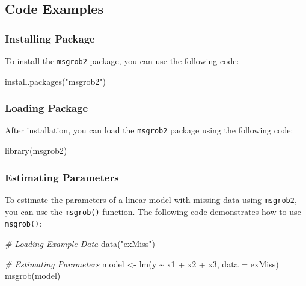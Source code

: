 \documentclass[
]{book}
\newenvironment{Shaded}{\begin{snugshade}}{\end{snugshade}}
\newcommand{\AttributeTok}[1]{\textcolor[rgb]{0.77,0.63,0.00}{#1}}
\newcommand{\CommentTok}[1]{\textcolor[rgb]{0.56,0.35,0.01}{\textit{#1}}}
\newcommand{\FunctionTok}[1]{\textcolor[rgb]{0.00,0.00,0.00}{#1}}
\newcommand{\NormalTok}[1]{#1}
\newcommand{\OtherTok}[1]{\textcolor[rgb]{0.56,0.35,0.01}{#1}}
\newcommand{\SpecialCharTok}[1]{\textcolor[rgb]{0.00,0.00,0.00}{#1}}
\newcommand{\StringTok}[1]{\textcolor[rgb]{0.31,0.60,0.02}{#1}}
\begin{document}
\hypertarget{code-examples}{%
\subsection{Code Examples}\label{code-examples}}

\hypertarget{installing-package}{%
\subsubsection{Installing Package}\label{installing-package}}

To install the \texttt{msgrob2} package, you can use the following code:

\begin{Shaded}
\begin{Highlighting}[]
\FunctionTok{install.packages}\NormalTok{(}\StringTok{"msgrob2"}\NormalTok{)}
\end{Highlighting}
\end{Shaded}

\hypertarget{loading-package}{%
\subsubsection{Loading Package}\label{loading-package}}

After installation, you can load the \texttt{msgrob2} package using the following code:

\begin{Shaded}
\begin{Highlighting}[]
\FunctionTok{library}\NormalTok{(msgrob2)}
\end{Highlighting}
\end{Shaded}

\hypertarget{estimating-parameters}{%
\subsubsection{Estimating Parameters}\label{estimating-parameters}}

To estimate the parameters of a linear model with missing data using \texttt{msgrob2}, you can use the \texttt{msgrob()} function. The following code demonstrates how to use \texttt{msgrob()}:

\begin{Shaded}
\begin{Highlighting}[]
\CommentTok{\# Loading Example Data}
\FunctionTok{data}\NormalTok{(}\StringTok{"exMiss"}\NormalTok{)}

\CommentTok{\# Estimating Parameters}
\NormalTok{model }\OtherTok{\textless{}{-}} \FunctionTok{lm}\NormalTok{(y }\SpecialCharTok{\textasciitilde{}}\NormalTok{ x1 }\SpecialCharTok{+}\NormalTok{ x2 }\SpecialCharTok{+}\NormalTok{ x3, }\AttributeTok{data =}\NormalTok{ exMiss)}
\FunctionTok{msgrob}\NormalTok{(model)}
\end{Highlighting}
\end{Shaded}
\end{document}
